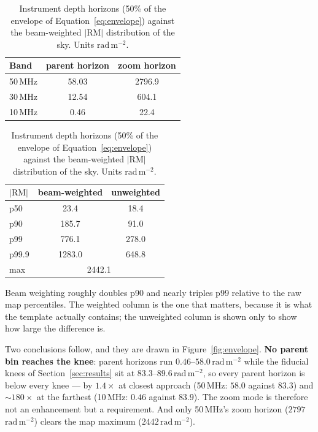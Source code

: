 \documentclass[11pt]{article}
\newcommand{\rmu}{\ensuremath{\mathrm{rad\,m^{-2}}}}
\begin{document}
\begin{table}[htbp]
  \centering
  \caption{Instrument depth horizons (50\% of the envelope of
  Equation~\eqref{eq:envelope}) against the beam-weighted $|\mathrm{RM}|$
  distribution of the sky. Units \rmu.}
  \label{tab:horizon}
  \begin{minipage}{0.46\textwidth}
    \centering
    \begin{tabular}{lcc}
      \toprule
      Band & parent horizon & zoom horizon \\
      \midrule
      50\,MHz & 58.03 & 2796.9 \\
      30\,MHz & 12.54 & 604.1 \\
      10\,MHz & 0.46  & 22.4 \\
      \bottomrule
    \end{tabular}
  \end{minipage}
  \hfill
  \begin{minipage}{0.46\textwidth}
    \centering
    \begin{tabular}{lcc}
      \toprule
      $|\mathrm{RM}|$ & beam-weighted & unweighted \\
      \midrule
      p50    & 23.4   & 18.4 \\
      p90    & 185.7  & 91.0 \\
      p99    & 776.1  & 278.0 \\
      p99.9  & 1283.0 & 648.8 \\
      max    & \multicolumn{2}{c}{2442.1} \\
      \bottomrule
    \end{tabular}
  \end{minipage}
\end{table}

Beam weighting roughly doubles p90 and nearly triples p99 relative to the
raw map percentiles. The weighted column is the one that matters, because
it is what the template actually contains; the unweighted column is shown
only to show how large the difference is.

Two conclusions follow, and they are drawn in
Figure~\ref{fig:envelope}. \textbf{No parent bin reaches the knee}:
parent horizons run $0.46$--$58.0$\,\rmu{} while the fiducial knees of
Section~\ref{sec:results} sit at $83.3$--$89.6$\,\rmu, so every parent
horizon is below every knee --- by $1.4\times$ at closest approach
(50\,MHz: $58.0$ against $83.3$) and $\sim\!180\times$ at the farthest
(10\,MHz: $0.46$ against $83.9$). The zoom mode is therefore not an
enhancement but a requirement. And only 50\,MHz's zoom horizon
($2797$\,\rmu) clears the map maximum ($2442$\,\rmu).
\end{document}
